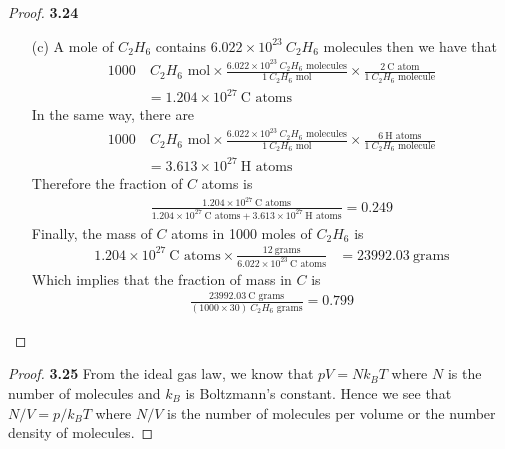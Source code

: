 \documentclass[11pt]{article}
\theoremstyle{definition}
\begin{document}
\begin{proof}{\textbf{3.24}}
\begin{itemize}
        \item [(c)] A mole of $C_2H_6$ contains
        $6.022\times 10^{23}~C_2H_6\text{ molecules}$ then we have that
        \begin{align*}
            1000&~C_2H_6\text{ mol}
            \times
            \frac{6.022\times 10^{23}~C_2H_6\text{ molecules}}{1~C_2H_6\text{ mol}}
            \times \frac{2~\text{C atom}}{1~C_2H_6\text{ molecule}}\\
            &= 1.204\times 10^{27}~\text{C atoms}
        \end{align*}
        In the same way, there are 
        \begin{align*}
            1000&~C_2H_6\text{ mol}
            \times
            \frac{6.022\times 10^{23}~C_2H_6\text{ molecules}}{1~C_2H_6\text{ mol}}
            \times \frac{6~\text{H atoms}}{1~C_2H_6\text{ molecule}}\\
            &= 3.613\times 10^{27}~\text{H atoms}
        \end{align*}
        Therefore the fraction of $C$ atoms is
        \begin{align*}
            \frac
            {1.204\times 10^{27}~\text{C atoms}}
            {
                1.204\times 10^{27}~\text{C atoms}
                + 3.613\times 10^{27}~\text{H atoms}
            }
            = 0.249
        \end{align*}
        Finally, the mass of $C$ atoms in 1000 moles of $C_2H_6$ is
        \begin{align*}
            1.204\times 10^{27}~\text{C atoms}
            \times \frac{12~\text{grams}}{6.022\times 10^{23}~\text{C atoms}}
            &= 23992.03~\text{grams}
        \end{align*}
        Which implies that the fraction of mass in $C$ is
        \begin{align*}
            \frac{23992.03~\text{C grams}}{(1000 \times 30)~C_2H_6\text{ grams}}
            = 0.799
        \end{align*}

    \end{itemize}    
\end{proof}
\begin{proof}{\textbf{3.25}}
    From the ideal gas law, we know that $pV = N k_B T$ where $N$ is the number
    of molecules and $k_B$ is Boltzmann's constant. Hence we see that
    $N/V = p/k_B T$ where $N/V$ is the number of molecules per volume
    or the number density of molecules.
\end{proof}
\end{document}

